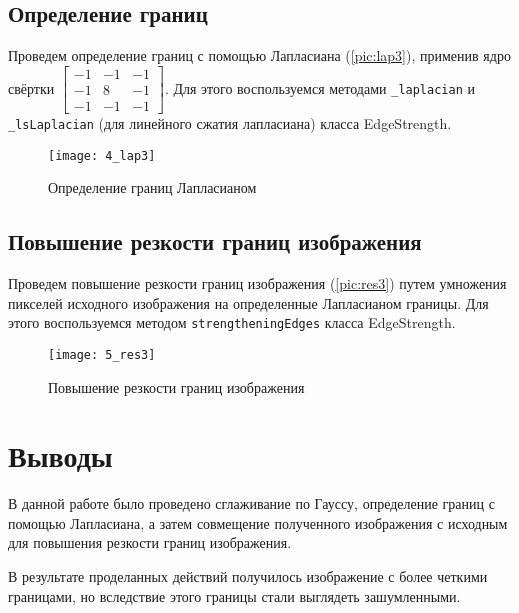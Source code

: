 \subsection{Определение границ}

Проведем определение границ с помощью Лапласиана (\vref{pic:lap3}), применив ядро свёртки 
$\begin{bmatrix}
    -1 & -1 & -1 \\
    -1 &  8 & -1 \\
    -1 & -1 & -1
\end{bmatrix}$. Для этого воспользуемся методами \texttt{\_laplacian} и \texttt{\_lsLaplacian} (для линейного сжатия лапласиана) класса EdgeStrength.

\begin{figure}[H]
	\centering
	\texttt{[image: 4\_lap3]}
	\caption{Определение границ Лапласианом}
	\label{pic:lap3}
\end{figure}

\subsection{Повышение резкости границ изображения}

Проведем повышение резкости границ изображения (\vref{pic:res3}) путем умножения пикселей исходного изображения на определенные Лапласианом границы. Для этого воспользуемся методом \texttt{strengtheningEdges} класса EdgeStrength.

\begin{figure}[H]
	\centering
	\texttt{[image: 5\_res3]}
	\caption{Повышение резкости границ изображения}
	\label{pic:res3}
\end{figure}

\section{Выводы}

В данной работе было проведено сглаживание по Гауссу, определение границ с помощью Лапласиана, а затем совмещение полученного изображения с исходным для повышения резкости границ изображения.

В результате проделанных действий получилось изображение с более четкими границами, но вследствие этого границы стали выглядеть зашумленными.

